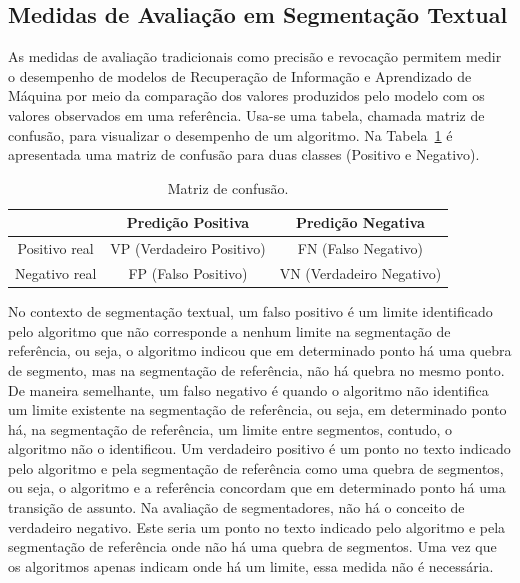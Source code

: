\subsection{Medidas de Avaliação em Segmentação Textual}
\label{subsec:medidas-segmentacao}

% 


As medidas de avaliação tradicionais como precisão e revocação permitem medir o desempenho de modelos de Recuperação de Informação e Aprendizado de Máquina por meio da comparação dos valores produzidos pelo modelo com os valores observados em uma referência. 
Usa-se uma tabela, chamada matriz de confusão, para visualizar o desempenho de um algoritmo. Na Tabela~\ref{tab:matrizconfusao} é apresentada uma matriz de confusão para duas classes (Positivo e Negativo). 


\begin{table}[!h]
\centering

\begin{tabular}{|c|c|c|}
  \hline
				& Predição Positiva        & Predição Negativa        \\ \hline
  Positivo real & VP (Verdadeiro Positivo) & FN (Falso Negativo)      \\ \hline
  Negativo real & FP (Falso Positivo)      & VN (Verdadeiro Negativo) \\ \hline

\end{tabular}

\caption{Matriz de confusão.}
\label{tab:matrizconfusao}

\end{table}



No contexto de segmentação textual, um falso positivo é um limite identificado pelo algoritmo que não corresponde a nenhum limite na segmentação de referência, ou seja, o algoritmo indicou que em determinado ponto há uma quebra de segmento, mas na segmentação de referência, não há quebra no mesmo ponto. De maneira semelhante, um falso negativo é quando o algoritmo não identifica um limite existente na segmentação de referência, ou seja, em determinado ponto há, na segmentação de referência, um limite entre segmentos, contudo, o algoritmo não o identificou.  Um verdadeiro positivo é um ponto no texto indicado pelo algoritmo e pela segmentação de referência como uma quebra de segmentos, ou seja, o algoritmo e a referência concordam que em determinado ponto há uma transição de assunto.  Na avaliação de segmentadores, não há o conceito de verdadeiro negativo. Este seria um ponto no texto indicado pelo algoritmo e pela segmentação de referência onde não há uma quebra de segmentos. Uma vez que os algoritmos apenas indicam onde há um limite, essa medida não é necessária. %


